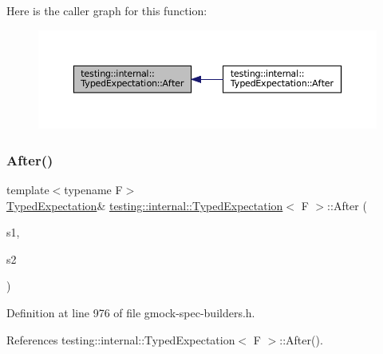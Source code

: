 Here is the caller graph for this function\+:
\nopagebreak
\begin{figure}[H]
\begin{center}
\leavevmode
\includegraphics[width=350pt]{classtesting_1_1internal_1_1TypedExpectation_a30f320d18ebf1a40e94883d7a56c6c8c_icgraph}
\end{center}
\end{figure}
\mbox{\label{classtesting_1_1internal_1_1TypedExpectation_a8e272fc396e508a2e63b13be30f81f15}} 
\subsubsection{\texorpdfstring{After()}{After()}\hspace{0.1cm}{\footnotesize\ttfamily [2/5]}}
{\footnotesize\ttfamily template$<$typename F$>$ \\
\hyperlink{classtesting_1_1internal_1_1TypedExpectation}{Typed\+Expectation}\& \hyperlink{classtesting_1_1internal_1_1TypedExpectation}{testing\+::internal\+::\+Typed\+Expectation}$<$ F $>$\+::After (\begin{DoxyParamCaption}\item[{const \hyperlink{classtesting_1_1ExpectationSet}{Expectation\+Set} \&}]{s1,  }\item[{const \hyperlink{classtesting_1_1ExpectationSet}{Expectation\+Set} \&}]{s2 }\end{DoxyParamCaption})\hspace{0.3cm}{\ttfamily [inline]}}



Definition at line 976 of file gmock-\/spec-\/builders.\+h.



References testing\+::internal\+::\+Typed\+Expectation$<$ F $>$\+::\+After().


